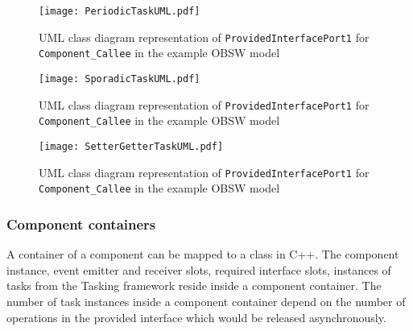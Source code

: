 \begin{figure}[h]
	\centering
	\texttt{[image: PeriodicTaskUML.pdf]}
	\caption{UML class diagram representation of \texttt{Provided\allowbreak Interface\allowbreak Port1} for \texttt{Component\allowbreak\_Callee} in the example OBSW model}
	\label{fig: Periodic task UML}
\end{figure}

\begin{figure}[h]
	\centering
	\texttt{[image: SporadicTaskUML.pdf]}
	\caption{UML class diagram representation of \texttt{Provided\allowbreak Interface\allowbreak Port1} for \texttt{Component\allowbreak\_Callee} in the example OBSW model}
	\label{fig: Sporadic task UML}
\end{figure}

\begin{figure}[h]
	\centering
	\texttt{[image: SetterGetterTaskUML.pdf]}
	\caption{UML class diagram representation of \texttt{Provided\allowbreak Interface\allowbreak Port1} for \texttt{Component\allowbreak\_Callee} in the example OBSW model}
	\label{fig: Status value getter setter task UML}
\end{figure}

\subsubsection{\textbf{Component containers}}
A container of a component can be mapped to a class in C++. The component instance, event emitter and receiver slots, required interface slots, instances of tasks from the Tasking framework reside inside a component container. The number of task instances inside a component container depend on the number of operations in the provided interface which would be released asynchronously. 

 
   



 


 

